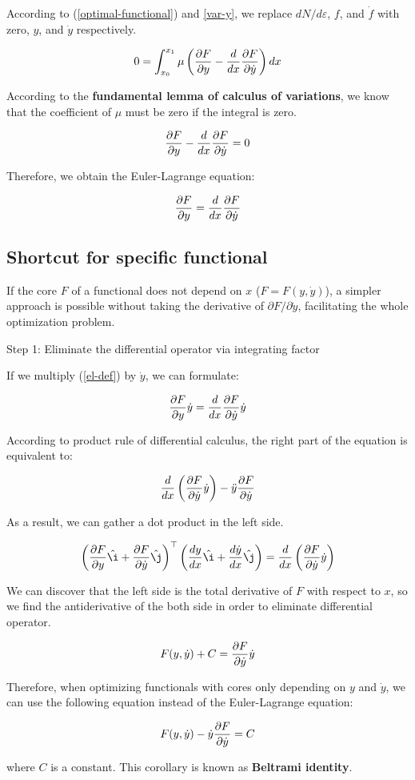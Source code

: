 \documentclass{article}
\begin{document}
According to (\ref{optimal-functional}) and \ref{var-y}, we replace
$dN/d\varepsilon$, $f$, and $\dot{f}$ with zero, $y$, and $\dot{y}$
respectively.

$$
0=\int_{x_0}^{x_1}\mu\left({\partial F\over\partial y}-{d\over dx}
{\partial F\over\partial\dot{y}}\right)dx
$$

According to the \textbf{fundamental lemma of calculus of variations}, we know
that the coefficient of $\mu$ must be zero if the integral is zero.

$$
{\partial F\over\partial y}-{d\over dx}{\partial F\over\partial\dot{y}}=0
$$

Therefore, we obtain the Euler-Lagrange equation:

\begin{equation}
	{\partial F\over\partial y}={d\over dx}{\partial F\over\partial\dot{y}}
	\label{el-def}
\end{equation}

\subsection{Shortcut for specific functional}

If the core $F$ of a functional does not depend on $x$ ($F=F(y,\dot{y})$), a
simpler approach is possible without taking the derivative of $\partial
F/\partial\dot{y}$, facilitating the whole optimization problem.

\begin{flushleft}
	Step 1: Eliminate the differential operator via integrating factor
\end{flushleft}

If we multiply (\ref{el-def}) by $\dot{y}$, we can formulate:

$$
{\partial F\over\partial y}\dot{y}=
{d\over dx}{\partial F\over\partial\dot{y}}\dot{y}
$$

According to product rule of differential calculus, the right part of the
equation is equivalent to:

$$
{d\over dx}\left({\partial F\over\partial\dot{y}}\dot{y}\right)
-\ddot{y}{\partial F\over\partial\dot{y}}
$$

As a result, we can gather a dot product in the left side.

$$
\left({\partial F\over\partial y}\hat{\i}
+{\partial F\over\partial\dot{y}}\hat{\j}\right)^\top
\left({dy\over dx}\hat{\i}+{d\dot{y}\over dx}\hat{\j}\right)
={d\over dx}\left({\partial F\over\partial\dot{y}}\dot{y}\right)
$$

We can discover that the left side is the total derivative of $F$ with respect
to $x$, so we find the antiderivative of the both side in order to eliminate
differential operator.

$$
F(y,\dot{y})+C={\partial F\over\partial\dot{y}}\dot{y}
$$

Therefore, when optimizing functionals with cores only depending on $y$ and
$\dot{y}$, we can use the following equation instead of the Euler-Lagrange
equation:

$$
F(y,\dot{y})-\dot{y}{\partial F\over\partial\dot{y}}=C
$$

where $C$ is a constant. This corollary is known as \textbf{Beltrami identity}.
\end{document}
